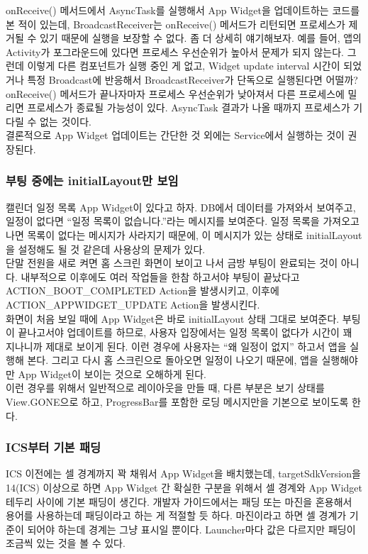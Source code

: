 onReceive() 메서드에서 AsyncTask를 실행해서 App Widget을 업데이트하는 코드를 본 적이 있는데, BroadcastReceiver는 onReceive() 메서드가 리턴되면 프로세스가 제거될 수 있기 때문에 실행을 보장할 수 없다.
좀 더 상세히 얘기해보자. 예를 들어, 앱의 Activity가 포그라운드에 있다면 프로세스 우선순위가 높아서 문제가 되지 않는다. 그런데 이렇게 다른 컴포넌트가 실행 중인 게 없고, Widget update interval 시간이 되었거나 특정 Broadcast에 반응해서 BroadcastReceiver가 단독으로 실행된다면 어떨까? 
onReceive() 메서드가 끝나자마자 프로세스 우선순위가 낮아져서 다른 프로세스에 밀리면 프로세스가 종료될 가능성이 있다. AsyncTask 결과가 나올 때까지 프로세스가 기다릴 수 없는 것이다.\\

결론적으로 App Widget 업데이트는 간단한 것 외에는 Service에서 실행하는 것이 권장된다. 

\subsubsection{부팅 중에는 initialLayout만 보임}
캘린더 일정 목록 App Widget이 있다고 하자. 
DB에서 데이터를 가져와서 보여주고, 일정이 없다면 ``일정 목록이 없습니다.''라는 메시지를 보여준다.
일정 목록을 가져오고나면 목록이 없다는 메시지가 사라지기 때문에, 이 메시지가 있는 상태로 initialLayout을 설정해도 될 것 같은데 사용상의 문제가 있다.\\

단말 전원을 새로 켜면 홈 스크린 화면이 보이고 나서 금방 부팅이 완료되는 것이 아니다. 
내부적으로 이후에도 여러 작업들을 한참 하고서야 부팅이 끝났다고 ACTION\_BOOT\_COMPLETED Action을 발생시키고, 이후에 ACTION\_APPWIDGET\_UPDATE Action을 발생시킨다.\\

화면이 처음 보일 때에 App Widget은 바로 initialLayout 상태 그대로 보여준다. 부팅이 끝나고서야 업데이트를 하므로, 사용자 입장에서는 일정 목록이 없다가 시간이 꽤 지나니까 제대로 보이게 된다.
이런 경우에 사용자는 ``왜 일정이 없지'' 하고서 앱을 실행해 본다. 그리고 다시 홈 스크린으로 돌아오면 일정이 나오기 때문에, 앱을 실행해야만 App Widget이 보이는 것으로 오해하게 된다.\\

이런 경우를 위해서 일반적으로 레이아웃을 만들 때, 다른 부분은 보기 상태를 View.GONE으로 하고, ProgressBar를 포함한 로딩 메시지만을 기본으로 보이도록 한다.

\subsubsection{ICS부터 기본 패딩}
\label{subsubsec:icspadding}
ICS 이전에는 셀 경계까지 꽉 채워서 App Widget을 배치했는데, targetSdkVersion을 14(ICS) 이상으로 하면 App Widget 간 확실한 구분을 위해서 셀 경계와 App Widget 테두리 사이에 기본 패딩이 생긴다. 개발자 가이드에서는 패딩 또는 마진을 혼용해서 용어를 사용하는데 패딩이라고 하는 게 적절할 듯 하다. 마진이라고 하면 셀 경계가 기준이 되어야 하는데 경계는 그냥 표시일 뿐이다. Launcher마다 값은 다르지만 패딩이 조금씩 있는 것을 볼 수 있다.\\

